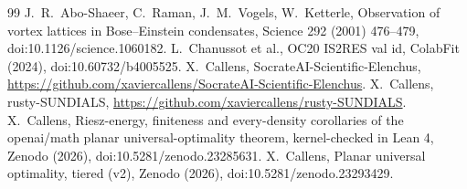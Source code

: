 \begin{thebibliography}{99}
 J.~R.~Abo-Shaeer, C.~Raman, J.~M.~Vogels, W.~Ketterle, Observation of vortex lattices in Bose--Einstein condensates, Science 292 (2001) 476--479, doi:10.1126/science.1060182.
 L.~Chanussot et al., OC20 IS2RES val id, ColabFit (2024), doi:10.60732/b4005525.
 X.~Callens, SocrateAI-Scientific-Elenchus, \url{https://github.com/xaviercallens/SocrateAI-Scientific-Elenchus}.
 X.~Callens, rusty-SUNDIALS, \url{https://github.com/xaviercallens/rusty-SUNDIALS}.
 X.~Callens, Riesz-energy, finiteness and every-density corollaries of the openai/math planar universal-optimality theorem, kernel-checked in Lean 4, Zenodo (2026), doi:10.5281/zenodo.23285631.
 X.~Callens, Planar universal optimality, tiered (v2), Zenodo (2026), doi:10.5281/zenodo.23293429.
\end{thebibliography}
